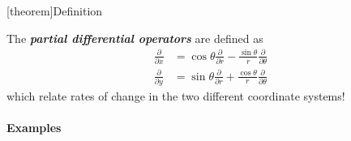 \documentclass[12pt]{report}
\theoremstyle{definition}
\begin{document}
[theorem]{Definition}
\begin{partial differential operators}
    The \textbf{\emph{partial differential operators}} are defined as\[
        \begin{align*}
            \frac{\partial}{\partial x} & = \cos{\theta}\frac{\partial}{\partial r}
            - \frac{\sin{\theta}}{r}\frac{\partial}{\partial \theta} \\
            \frac{\partial}{\partial y} & = \sin{\theta}\frac{\partial}{\partial r} 
            + \frac{\cos{\theta}}{r}\frac{\partial}{\partial \theta}
        \end{align*}
    \]which relate rates of change in the two different coordinate systems!
\end{partial differential operators}

\paragraph{Examples}
\,
\end{document}
